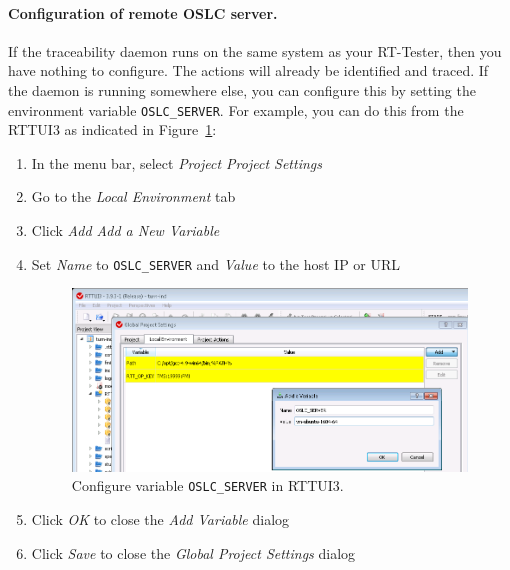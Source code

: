 \paragraph{Configuration of remote OSLC server.}
If the traceability daemon runs on the same system as your RT-Tester, then you
have nothing to configure. The actions will already be identified and traced. 
%
If the daemon is running somewhere else, you can configure this by setting the
environment variable {\tt OSLC\_SERVER}.
%
For example, you can do this from the RTTUI3 as indicated in Figure~\ref{fig:VSI_configure_oscl}:
%
\begin{enumerate}
\item    In the menu bar, select \emph{Project \textrightarrow Project Settings}
\item    Go to the \emph{Local Environment} tab
\item    Click \emph{Add \textrightarrow Add a New Variable}
\item    Set \emph{Name} to {\tt OSLC\_SERVER} and \emph{Value} to the host IP or URL
%
\begin{figure}[htbp]
\centering
\includegraphics[width=0.99\textwidth]{figures/VSI-rttui3-set-oscl-server}
\caption{Configure variable {\tt OSLC\_SERVER} in RTTUI3.}
\label{fig:VSI_configure_oscl}
\end{figure}
%
\item    Click \emph{OK} to close the \emph{Add Variable} dialog
\item    Click \emph{Save} to close the \emph{Global Project Settings} dialog
\end{enumerate}
%
